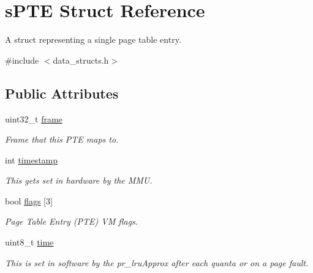 \hypertarget{structsPTE}{\section{s\-P\-T\-E \-Struct \-Reference}
\label{db/d4b/structsPTE}
}


\-A struct representing a single page table entry.  




{\ttfamily \#include $<$data\-\_\-structs.\-h$>$}

\subsection*{\-Public \-Attributes}
\begin{DoxyCompactItemize}
\item 
\hypertarget{structsPTE_a7f83c711e07dc476cceb9ac15ea010d7}{uint32\-\_\-t \hyperlink{structsPTE_a7f83c711e07dc476cceb9ac15ea010d7}{frame}}\label{db/d4b/structsPTE_a7f83c711e07dc476cceb9ac15ea010d7}

\begin{DoxyCompactList}\small\item\em \-Frame that this \-P\-T\-E maps to. \end{DoxyCompactList}\item 
\hypertarget{structsPTE_a8b5b24029a238d20968676a78a81928c}{int \hyperlink{structsPTE_a8b5b24029a238d20968676a78a81928c}{timestamp}}\label{db/d4b/structsPTE_a8b5b24029a238d20968676a78a81928c}

\begin{DoxyCompactList}\small\item\em \-This gets set in hardware by the \-M\-M\-U. \end{DoxyCompactList}\item 
bool \hyperlink{structsPTE_a5088ab9c05c286c643ef97d04a3c9dad}{flags} \mbox{[}3\mbox{]}
\begin{DoxyCompactList}\small\item\em \-Page \-Table \-Entry (\-P\-T\-E) \-V\-M flags. \end{DoxyCompactList}\item 
\hypertarget{structsPTE_a73f0dd13e3c1909cee215ff78c99e487}{uint8\-\_\-t \hyperlink{structsPTE_a73f0dd13e3c1909cee215ff78c99e487}{time}}\label{db/d4b/structsPTE_a73f0dd13e3c1909cee215ff78c99e487}

\begin{DoxyCompactList}\small\item\em \-This is set in software by the pr\-\_\-lru\-Approx after each quanta or on a page fault. \end{DoxyCompactList}\end{DoxyCompactItemize}


